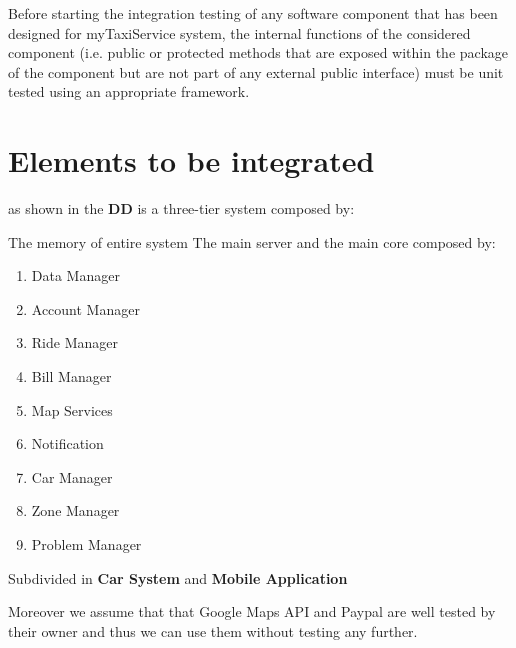 Before starting the integration testing of any software component that has been designed for myTaxiService system, the internal functions of the considered component (i.e. public or protected methods that are exposed within the package of the component but are not part of any external public interface) must be unit tested using an appropriate framework.
\section{Elements to be integrated}
\PowerEnJoy{} as shown in the \textbf{DD} is a three-tier system composed by:
\begin{itemize}
	 The memory of \PowerEnJoy{} entire system
	 The main server and the main core composed by:
		\begin{enumerate}
			\item Data Manager
			\item Account Manager
			\item Ride Manager
			\item Bill Manager
			\item Map Services
			\item Notification
			\item Car Manager
			\item Zone Manager
			\item Problem Manager
		\end{enumerate}
	 Subdivided in \textbf{Car System} and \textbf{Mobile Application}
\end{itemize}
Moreover we assume that that Google Maps API and Paypal are well tested by their owner and thus we can use them without testing any further.
